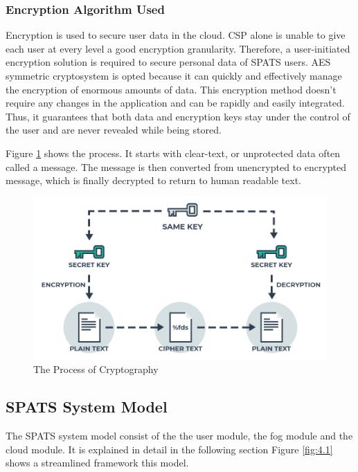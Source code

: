 \documentclass[10pt]{article}
\begin{document}
\subsubsection{Encryption Algorithm Used}
Encryption is used to secure user data in the cloud. 
CSP alone is unable to give each user at every level a good encryption granularity. Therefore, a user-initiated encryption solution is required to secure personal data of SPATS users. AES symmetric cryptosystem is opted because it can quickly and effectively manage the encryption of enormous amounts of data. 
This encryption method doesn't require any changes in the application and can be rapidly and easily integrated. Thus, it guarantees that both data and encryption keys stay under the control of the user and are never revealed while being stored.

Figure \ref{fig:4} shows the process. It starts with clear-text, or unprotected data often called a message. The message is then converted from unencrypted to encrypted message, which is finally decrypted to return to human readable text.
\begin{figure}[H]
    \begin{center}
        \includegraphics[width=0.7\linewidth,frame]{CA2-template/R3.png}
        \caption{The Process of Cryptography\label{fig:4}}
    \end{center}
\end{figure}

\newline

\subsection{SPATS System Model}
The SPATS system model consist of the the user module, the fog module and the cloud module. It is explained in detail in the following section Figure \ref{fig:4.1} shows a streamlined framework this model. 
\end{document}
